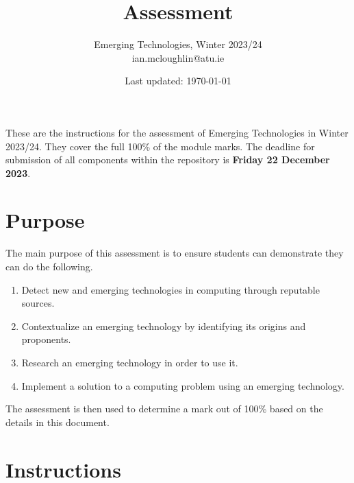 \documentclass{iansnotes}
\title{Assessment}
\author{Emerging Technologies, Winter 2023/24\\ian.mcloughlin@atu.ie}
\date{Last updated: \today}
\begin{document}
 
\maketitle

These are the instructions for the assessment of Emerging Technologies in Winter 2023/24.
They cover the full 100\% of the module marks.
The deadline for submission of all components within the repository is \textbf{Friday 22 December 2023}.

\section{Purpose}
The main purpose of this assessment is to ensure students can demonstrate they can do the following.
\begin{enumerate}
  \item Detect new and emerging technologies in computing through reputable sources.
  \item Contextualize an emerging technology by identifying its origins and proponents.
  \item Research an emerging technology in order to use it.
  \item Implement a solution to a computing problem using an emerging technology.
\end{enumerate}
The assessment is then used to determine a mark out of 100\% based on the details in this document.


\section{Instructions}
\end{document}
